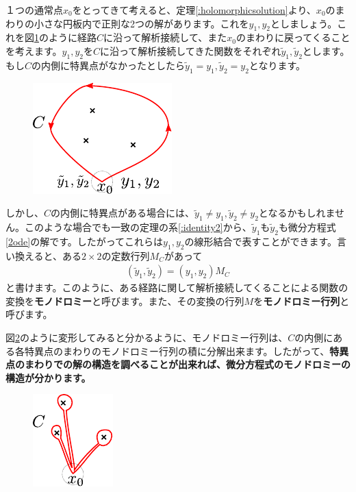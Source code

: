 \documentclass[report,paper=a4, fontsize=12pt, line_length=16cm, number_of_lines=33,dvipdfmx]{jlreq}
\numberwithin{equation}{section}
\newcommand{\strong}[1]{\textsf{\bfseries #1}}
\newcommand{\yt}{\tilde{y}}
\begin{document}
１つの通常点$x_0$をとってきて考えると、定理\ref{:holomorphicsolution}より、$x_0$のまわりの小さな円板内で正則な2つの解があります。これを$y_1,y_2$としましょう。これを図\ref{fig:monodromy}のように経路$C$に沿って解析接続して、また$x_0$のまわりに戻ってくることを考えます。$y_1,y_2$を$C$に沿って解析接続してきた関数をそれぞれ$\yt_1,\yt_2$とします。もし$C$の内側に特異点がなかったとしたら$\yt_1=y_1,\yt_2=y_2$となります。
\begin{figure}[htbp]
  \centering
  \includegraphics{monodromy.pdf}
  \caption{}
  \label{fig:monodromy}
\end{figure}

しかし、$C$の内側に特異点がある場合には、$\yt_1\ne y_1,\yt_2\ne y_2$となるかもしれません。このような場合でも一致の定理の系\ref{:identity2}から、$\yt_1$も$\yt_2$も微分方程式\eqref{2ode}の解です。したがってこれらは$y_1,y_2$の線形結合で表すことができます。言い換えると、ある$2\times 2$の定数行列$M_C$があって
\begin{align}
  (\yt_1, \yt_2)
  =(y_1, y_2)M_{C}
\end{align}
と書けます。このように、ある経路に関して解析接続してくることによる関数の変換を\strong{モノドロミー}と呼びます。また、その変換の行列$M$を\strong{モノドロミー行列}と呼びます。

図\ref{fig:monodromy2}のように変形してみると分かるように、モノドロミー行列は、$C$の内側にある各特異点のまわりのモノドロミー行列の積に分解出来ます。したがって、\strong{特異点のまわりでの解の構造を調べることが出来れば、微分方程式のモノドロミーの構造が分かります。}
\begin{figure}[htbp]
  \centering
  \includegraphics{monodromy2.pdf}
  \caption{}
  \label{fig:monodromy2}
\end{figure}
\end{document}
